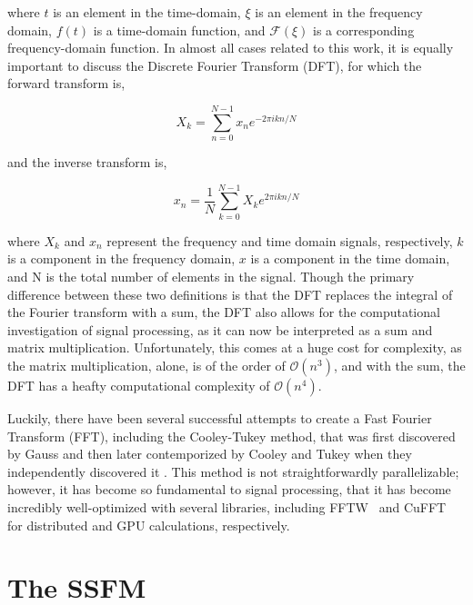 \noindent where $t$ is an element in the time-domain, $\xi$ is an element in the frequency domain, $f(t)$ is a time-domain function, and $\mathcal{F}(\xi)$ is a corresponding frequency-domain function.
In almost all cases related to this work, it is equally important to discuss the Discrete Fourier Transform (DFT), for which the forward transform is,

$$
X_k = \sum_{n=0}^{N-1} x_n e^{-2 \pi i k n / N}
$$

\noindent and the inverse transform is,

$$
x_n = \frac{1}{N} \sum_{k=0}^{N-1} X_k e^{2 \pi i k n / N}
$$

\noindent where $X_k$ and $x_n$ represent the frequency and time domain signals, respectively, $k$ is a component in the frequency domain, $x$ is a component in the time domain, and N is the total number of elements in the signal.
Though the primary difference between these two definitions is that the DFT replaces the integral of the Fourier transform with a sum, the DFT also allows for the computational investigation of signal processing, as it can now be interpreted as a sum and matrix multiplication.
Unfortunately, this comes at a huge cost for complexity, as the matrix multiplication, alone, is of the order of $\mathcal{O}(n^3)$, and with the sum, the DFT has a heafty computational complexity of $\mathcal{O}(n^4)$.

Luckily, there have been several successful attempts to create a Fast Fourier Transform (FFT), including the Cooley-Tukey method, that was first discovered by Gauss and then later contemporized by Cooley and Tukey when they independently discovered it \cite{cooley1965}.
This method is not straightforwardly parallelizable; however, it has become so fundamental to signal processing, that it has become incredibly well-optimized with several libraries, including FFTW~\cite{frigo1998} and CuFFT~\cite{fatica2008} for distributed and GPU calculations, respectively.


\section{The SSFM}

